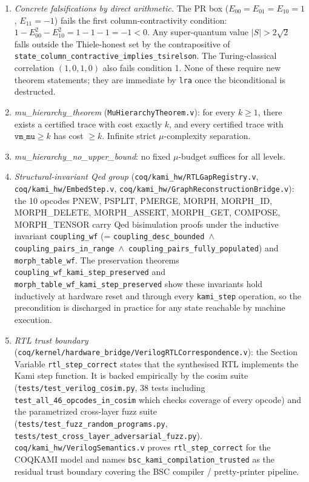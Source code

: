 \documentclass[11pt,a4paper]{article}
\theoremstyle{plain}
\theoremstyle{definition}
\theoremstyle{remark}
\begin{document}
{\begin{enumerate}
\item \textit{\small Concrete falsifications by direct arithmetic.} The PR box ($E_{00}=E_{01}=E_{10}=1$, $E_{11}=-1$) fails the first column-contractivity condition: $1 - E_{00}^2 - E_{10}^2 = 1 - 1 - 1 = -1 < 0$. Any super-quantum value $|S| > 2\sqrt{2}$ falls outside the Thiele-honest set by the contrapositive of \texttt{state\_column\_contractive\_implies\_tsirelson}. The Turing-classical correlation $(1,0,1,0)$ also fails condition 1. None of these require new theorem statements; they are immediate by \texttt{lra} once the biconditional is destructed.
\item \textit{\small mu\_hierarchy\_theorem} (\texttt{MuHierarchyTheorem.v}): for every $k \geq 1$, there exists a certified trace with cost exactly $k$, and every certified trace with $\texttt{vm\_mu} \geq k$ has cost $\geq k$. Infinite strict $\mu$-complexity separation.
\item \textit{\small mu\_hierarchy\_no\_upper\_bound}: no fixed $\mu$-budget suffices for all levels.
\item \textit{\small Structural-invariant Qed group} (\texttt{coq/kami\_hw/RTLGapRegistry.v}, \texttt{coq/kami\_hw/EmbedStep.v}, \texttt{coq/kami\_hw/GraphReconstructionBridge.v}): the 10 opcodes PNEW, PSPLIT, PMERGE, MORPH, MORPH\_ID, MORPH\_DELETE, MORPH\_ASSERT, MORPH\_GET, COMPOSE, MORPH\_TENSOR carry Qed bisimulation proofs under the inductive invariant \texttt{coupling\_wf} (= \texttt{coupling\_desc\_bounded $\wedge$ coupling\_pairs\_in\_range $\wedge$ coupling\_pairs\_fully\_populated}) and \texttt{morph\_table\_wf}. The preservation theorems \texttt{coupling\_wf\_kami\_step\_preserved} and \texttt{morph\_table\_wf\_kami\_step\_preserved} show these invariants hold inductively at hardware reset and through every \texttt{kami\_step} operation, so the precondition is discharged in practice for any state reachable by machine execution.
\item \textit{\small RTL trust boundary} (\texttt{coq/kernel/hardware\_bridge/VerilogRTLCorrespondence.v}): the Section Variable \texttt{rtl\_step\_correct} states that the synthesised RTL implements the Kami step function. It is backed empirically by the cosim suite (\texttt{tests/test\_verilog\_cosim.py}, 38 tests including \texttt{test\_all\_46\_opcodes\_in\_cosim} which checks coverage of every opcode) and the parametrized cross-layer fuzz suite (\texttt{tests/test\_fuzz\_random\_programs.py}, \texttt{tests/test\_cross\_layer\_adversarial\_fuzz.py}). \texttt{coq/kami\_hw/VerilogSemantics.v} proves \texttt{rtl\_step\_correct} for the COQKAMI model and names \texttt{bsc\_kami\_compilation\_trusted} as the residual trust boundary covering the BSC compiler / pretty-printer pipeline.
\end{enumerate}
}
\end{document}
